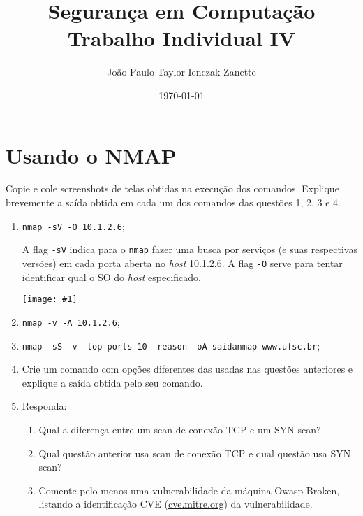 \documentclass{article}
\title{%
    Segurança em Computação \\
    Trabalho Individual IV
}
\author{João Paulo Taylor Ienczak Zanette}
\date{\today}
\newcommand{\code}[1]{\texttt{#1}}
\newcommand{\img}[1]{%
    \texttt{[image: \#1]}
}
\begin{document}
    \maketitle{}

    \section{Usando o NMAP}

    \begin{superframe}
        Copie e cole screenshots de telas obtidas na execução dos comandos.
        Explique brevemente a saída obtida em cada um dos comandos das questões
        1, 2, 3 e 4.

        \begin{enumerate}
            \item \texttt{nmap -sV -O 10.1.2.6};

                A flag \code{-sV} indica para o \code{nmap} fazer uma busca por
                serviços (e suas respectivas versões) em cada porta aberta no
                \textit{host} 10.1.2.6. A flag \code{-O} serve para tentar
                identificar qual o SO do \textit{host} especificado.

                \img{imgs/q1-1.png}

            \item \texttt{nmap -v -A 10.1.2.6};

            \item \texttt{nmap -sS -v --top-ports 10 --reason -oA saidanmap
                www.ufsc.br};
            \item Crie um comando com opções diferentes das usadas nas questões
                anteriores e explique a saída obtida pelo seu comando.
            \item Responda:
                \begin{enumerate}
                    \item Qual a diferença entre um scan de conexão TCP e um
                        SYN scan?
                    \item Qual questão anterior usa scan de conexão TCP e qual
                        questão usa SYN scan?
                    \item Comente pelo menos uma vulnerabilidade da máquina
                        Owasp Broken, listando a identificação CVE
                        (\url{cve.mitre.org}) da vulnerabilidade.
                \end{enumerate}
        \end{enumerate}
    \end{superframe}
\end{document}
